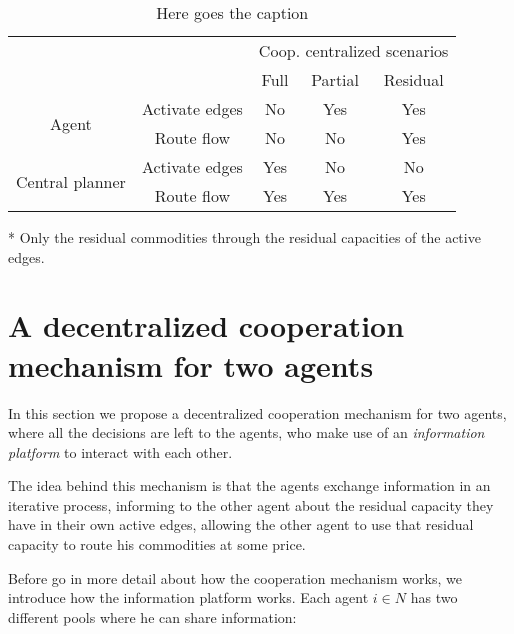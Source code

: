 \documentclass[review]{elsarticle}
\begin{document}
\begin{table}[ht!]
	\centering
	\caption{Here goes the caption \label{tb:summarycentralizedmodels}}
    \begin{threeparttable}
        \begin{tabular}{ccccc}
            & &      \multicolumn{3}{c}{Coop. centralized scenarios} \\\cline{3-5}
            & & Full & Partial & Residual \\ \hline
            \multirow{2}{*}{Agent} & Activate edges & No & Yes & Yes \\
            & Route flow     & No & No & Yes \\\hline
            \multirow{2}{*}{Central planner} & Activate edges & Yes & No & No \\
            & Route flow & Yes & Yes & Yes\tnote{*} \\\hline\hline
        \end{tabular}
    \begin{tablenotes}\footnotesize
        \item[*] Only the residual commodities through the residual capacities
        of the active edges.
        \end{tablenotes}
    \end{threeparttable}
    \end {table}

\section{A decentralized cooperation mechanism for two agents}

In this section we propose a decentralized cooperation mechanism for two agents, where all the decisions are left to the agents, who make use of an \emph{information platform} to interact with each other.

The idea behind this mechanism is that the agents exchange information in an iterative process, informing to the other agent about the residual capacity they have in their own active edges, allowing the other agent to use that residual capacity to route his commodities at some price.

Before go in more detail about how the cooperation mechanism works, we introduce how the information platform works. Each agent $i\in N$ has two different pools where he can share information:
\end{document}
